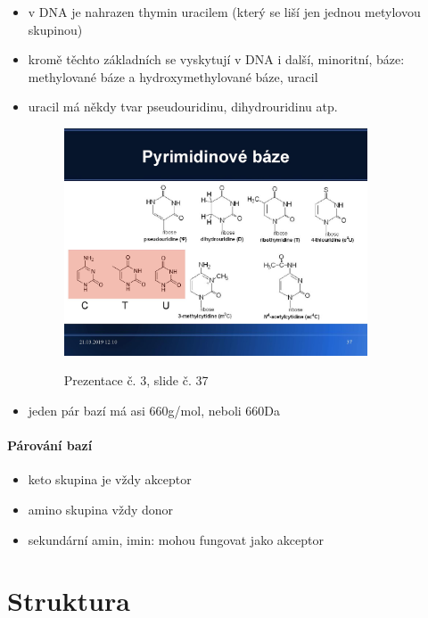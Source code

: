 \documentclass[DIV=8]{scrreprt}
\begin{document}
\begin{itemize}[nosep]
    \item v DNA je nahrazen thymin uracilem (který se liší jen jednou metylovou skupinou)
    \item kromě těchto základních se vyskytují v DNA i další, minoritní, báze: methylované báze a hydroxymethylované báze, uracil
    \item uracil má někdy tvar pseudouridinu, dihydrouridinu atp. \begin{figure}
    \caption{Prezentace č. 3, slide č. 37}
    \includegraphics[width=0.85\textwidth]{slides-3/slide-37.jpg}
    \centering
    \label{slides-3-slide-37}
\end{figure}

    \item jeden pár bazí má asi 660g/mol, neboli 660Da
\end{itemize}



\paragraph{Párování bazí}
\begin{itemize}[nosep]
    \item keto skupina je vždy akceptor
    \item amino skupina vždy donor
    \item sekundární amin, imin: mohou fungovat jako akceptor
\end{itemize}



\section{Struktura} \label{Struktura}
\end{document}
